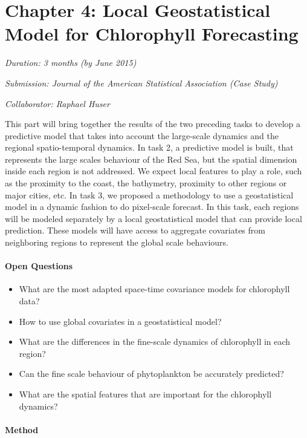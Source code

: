 \section{Chapter 4: Local Geostatistical Model for Chlorophyll Forecasting}

\noindent
\emph{Duration: 3 months (by June 2015)}

\noindent
\emph{Submission: Journal of the American Statistical Association (Case Study)}

\noindent
\emph{Collaborator: Raphael Huser}

This part will bring together the results of the two preceding tasks to develop a predictive model that takes into account the large-scale dynamics and the regional spatio-temporal dynamics. In task 2, a predictive model is built, that represents the large scales behaviour of the Red Sea, but the spatial dimension inside each region is not addressed. We expect local features to play a role, such as the proximity to the coast, the bathymetry, proximity to other regions or major cities, etc. In task 3, we proposed a methodology to use a geostatistical model in a dynamic fashion to do pixel-scale forecast. In this task, each regions will be modeled separately by a local geostatistical model that can provide local prediction. These models will have access to aggregate covariates from neighboring regions to represent the global scale behaviours. 

\paragraph{Open Questions}

\begin{itemize}
  \item What are the most adapted space-time covariance models for chlorophyll data?
  \item How to use global covariates in a geostatistical model?
  \item What are the differences in the fine-scale dynamics of chlorophyll in each region?
  \item Can the fine scale behaviour of phytoplankton be accurately predicted?
  \item What are the spatial features that are important for the chlorophyll dynamics?
\end{itemize}

\paragraph{Method}

